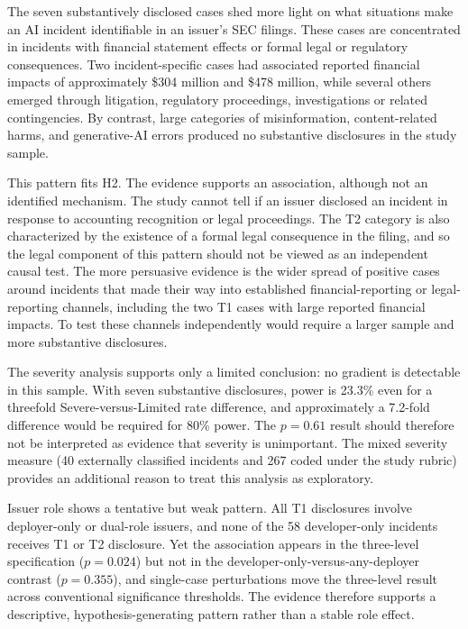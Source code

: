 \documentclass[utf8]{FrontiersinHarvard}
\begin{document}
The seven substantively disclosed cases shed more light on what situations make an AI incident identifiable in an issuer's SEC filings. These cases are concentrated in incidents with financial statement effects or formal legal or regulatory consequences. Two incident-specific cases had associated reported financial impacts of approximately \$304 million and \$478 million, while several others emerged through litigation, regulatory proceedings, investigations or related contingencies. By contrast, large categories of misinformation, content-related harms, and generative-AI errors produced no substantive disclosures in the study sample.

This pattern fits H2. The evidence supports an association, although not an identified mechanism. The study cannot tell if an issuer disclosed an incident in response to accounting recognition or legal proceedings. The T2 category is also characterized by the existence of a formal legal consequence in the filing, and so the legal component of this pattern should not be viewed as an independent causal test. The more persuasive evidence is the wider spread of positive cases around incidents that made their way into established financial-reporting or legal-reporting channels, including the two T1 cases with large reported financial impacts. To test these channels independently would require a larger sample and more substantive disclosures.

The severity analysis supports only a limited conclusion: no gradient is detectable in this sample. With seven substantive disclosures, power is 23.3\% even for a threefold Severe-versus-Limited rate difference, and approximately a 7.2-fold difference would be required for 80\% power. The $p = 0.61$ result should therefore not be interpreted as evidence that severity is unimportant. The mixed severity measure (40 externally classified incidents and 267 coded under the study rubric) provides an additional reason to treat this analysis as exploratory.

Issuer role shows a tentative but weak pattern. All T1 disclosures involve deployer-only or dual-role issuers, and none of the 58 developer-only incidents receives T1 or T2 disclosure. Yet the association appears in the three-level specification ($p = 0.024$) but not in the developer-only-versus-any-deployer contrast ($p = 0.355$), and single-case perturbations move the three-level result across conventional significance thresholds. The evidence therefore supports a descriptive, hypothesis-generating pattern rather than a stable role effect.
\end{document}
